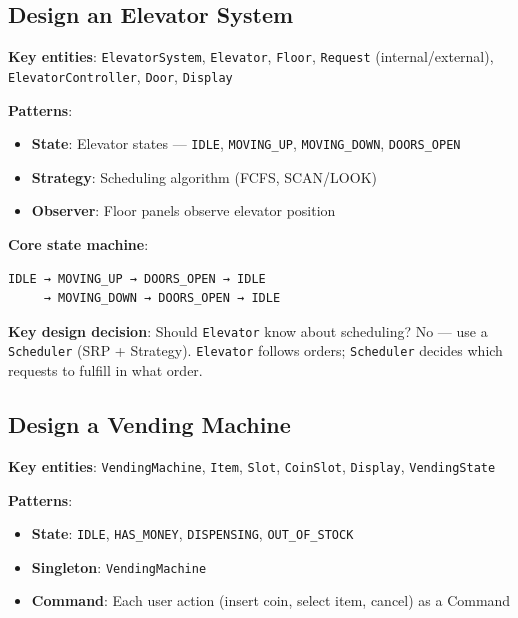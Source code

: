 \documentclass[11pt]{article}
\providecommand{\tightlist}{\setlength{\itemsep}{1pt}\setlength{\parskip}{0pt}}
\begin{document}
\subsection{Design an Elevator System}\label{design-an-elevator-system}

\textbf{Key entities}: \texttt{ElevatorSystem}, \texttt{Elevator}, \texttt{Floor}, \texttt{Request} (internal/external), \texttt{ElevatorController}, \texttt{Door}, \texttt{Display}

\textbf{Patterns}:

\begin{itemize}
\tightlist
\item
  \textbf{State}: Elevator states --- \texttt{IDLE}, \texttt{MOVING\_UP}, \texttt{MOVING\_DOWN}, \texttt{DOORS\_OPEN}
\item
  \textbf{Strategy}: Scheduling algorithm (FCFS, SCAN/LOOK)
\item
  \textbf{Observer}: Floor panels observe elevator position
\end{itemize}

\textbf{Core state machine}:

\setcodelang{}

\begin{verbatim}
IDLE → MOVING_UP → DOORS_OPEN → IDLE
     → MOVING_DOWN → DOORS_OPEN → IDLE
\end{verbatim}

\textbf{Key design decision}: Should \texttt{Elevator} know about scheduling? No --- use a \texttt{Scheduler} (SRP + Strategy). \texttt{Elevator} follows orders; \texttt{Scheduler} decides which requests to fulfill in what order.

\subsection{Design a Vending Machine}\label{design-a-vending-machine}

\textbf{Key entities}: \texttt{VendingMachine}, \texttt{Item}, \texttt{Slot}, \texttt{CoinSlot}, \texttt{Display}, \texttt{VendingState}

\textbf{Patterns}:

\begin{itemize}
\tightlist
\item
  \textbf{State}: \texttt{IDLE}, \texttt{HAS\_MONEY}, \texttt{DISPENSING}, \texttt{OUT\_OF\_STOCK}
\item
  \textbf{Singleton}: \texttt{VendingMachine}
\item
  \textbf{Command}: Each user action (insert coin, select item, cancel) as a Command
\end{itemize}
\end{document}
